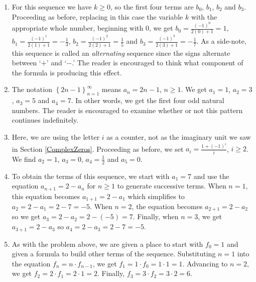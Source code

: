 \documentclass{ximera}
\begin{document}
\begin{example}
\begin{explanation}
\begin{enumerate}
\item For this sequence we have $k \geq 0$, so the first four terms are $b_0$, $b_1$, $b_2$ and $b_3$.  Proceeding as before, replacing in this case the variable $k$ with the appropriate whole number, beginning with $0$, we get $b_0 = \frac{(-1)^{0}}{2(0)+1} = 1$, $b_1 = \frac{(-1)^{1}}{2(1)+1} = - \frac{1}{3}$, $b_2 = \frac{(-1)^{2}}{2(2)+1} = \frac{1}{5}$ and $b_3 =  \frac{(-1)^{3}}{2(3)+1} = -\frac{1}{7}$.  As a side-note, this sequence is called an  \textit{alternating} sequence since the signs alternate between `$+$' and `$-$.' The reader is encouraged to think what component of the formula is producing this effect.

\item  The notation $\left\{ 2n - 1 \right\}_{n=1}^{\infty}$ means  $a_{n} = 2n -1$, $n \geq 1$.  We get $a_1 = 1$, $a_2 = 3$, $a_3 = 5$ and $a_4 = 7$.  In other words, we get the first four odd natural numbers.  The reader is encouraged to examine whether or not this pattern continues indefinitely.

\item  Here, we are using the letter $i$ as a counter, not as the imaginary unit we saw in Section \ref{ComplexZeros}.  Proceeding as before, we set $a_{i} = \frac{1 + (-1)^{i}}{i}$, $i \geq 2$.  We find $a_2 = 1$, $a_3 = 0$, $a_4 = \frac{1}{2}$ and $a_5 = 0$.  

\item  To obtain the terms of this sequence, we start with $a_1 = 7$ and use the equation $a_{n+1} = 2 - a_{n}$ for $n \geq 1$ to generate successive terms.  When $n = 1$, this equation becomes $a_{\text{$1 + 1$}} = 2 - a_1$ which simplifies to $a_2 = 2 - a_1 = 2 - 7 = -5$.  When $n = 2$, the equation becomes $a_{\text{$2 + 1$}} = 2 - a_2$ so we get $a_3 = 2 - a_2 = 2 - (-5) = 7$.  Finally, when $n = 3$, we get $a_{\text{$3 + 1$}} = 2 - a_3$ so $a_4 = 2 - a_3 = 2-7 = -5$.  

\item  As with the problem above, we are given a place to start with $f_0 = 1$ and given a formula to build other terms of the sequence.  Substituting $n = 1$ into the equation $f_{n} = n \cdot f_{n-1}$, we get $f_1 = 1 \cdot f_0 = 1 \cdot 1 = 1$.  Advancing to $n = 2$, we get $f_2 = 2 \cdot f_1 = 2 \cdot 1 = 2$.  Finally, $f_3 = 3 \cdot f_2 = 3 \cdot 2 = 6$.  

\end{enumerate}
\end{explanation}
\end{example}
\end{document}
